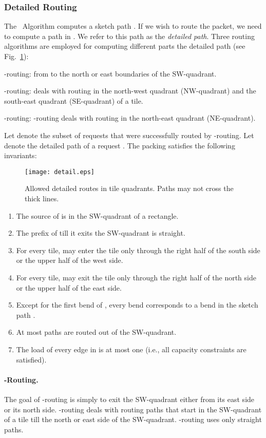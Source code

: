 \documentclass[11pt]{article}
\newcommand{\route}{\text{\sc{ipp}}}
\newcommand{\IPP}{\route}
\newenvironment{proof sketch}[1]{\noindent {\emph{Proof sketch of #1:}}}{\hfill \qed}
\begin{document}
\subsubsection{Detailed Routing}\label{sec:detail}
The \IPP\ Algorithm computes a sketch path . If we wish to
route the packet, we need to compute a path in . We refer
to this path as the \emph{detailed path}.
Three routing algorithms are employed for computing different parts the detailed path (see Fig.~\ref{fig:detail}):
\begin{inparaenum}[(1)]
  \item -routing: from  to the north or east boundaries of the SW-quadrant.
  \item -routing: deals with routing in the north-west quadrant (NW-quadrant) and  the south-east quadrant (SE-quadrant) of a tile.
  \item -routing: -routing deals with routing in the north-east quadrant (NE-quadrant).
\end{inparaenum}
Let  denote the subset of requests that were successfully routed by -routing.
Let  denote the detailed path of a request .
The packing  satisfies the following
invariants:
    \begin{figure}[h]
      \centering
        \texttt{[image: detail.eps]}
      \caption{Allowed detailed routes in tile quadrants. Paths may not
        cross the thick lines.}
      \label{fig:detail}
    \end{figure}
\begin{enumerate}
\item The source of  is in the SW-quadrant of a rectangle.
\item The prefix of  till it exits the SW-quadrant is straight.
\item For every tile,  may enter the tile only through the right half of the south side or the upper half of the west side.
\item For every tile,  may exit the tile only through the right half of the north side  or the upper half of the east side.
\item Except for the first bend of , every bend
    corresponds to a bend in the sketch path .
\item At most  paths are routed out of the
    SW-quadrant.
\item The load of every edge in  is at most one (i.e., all capacity constraints are satisfied).
\end{enumerate}

\paragraph{-Routing.}
The goal of -routing is simply to exit the SW-quadrant
either from its east side or its north side. -routing
deals with routing paths that start in the SW-quadrant of a
tile till the north or east side of the SW-quadrant.
-routing uses only straight paths.
\end{document}

